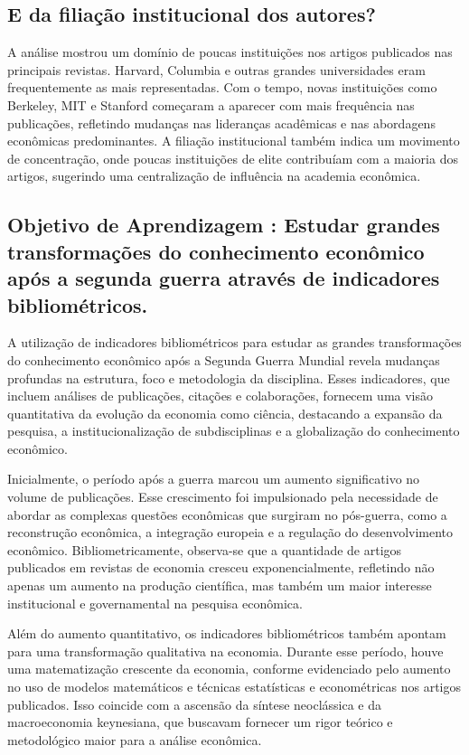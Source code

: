 \documentclass[a4paper,12pt]{article}[abntex2]
\begin{document}
\subsection{\textbf{E da filiação institucional dos autores?}}
 A análise mostrou um domínio de poucas instituições nos artigos publicados nas principais revistas. Harvard, Columbia e outras grandes universidades eram frequentemente as mais representadas. Com o tempo, novas instituições como Berkeley, MIT e Stanford começaram a aparecer com mais frequência nas publicações, refletindo mudanças nas lideranças acadêmicas e nas abordagens econômicas predominantes. A filiação institucional também indica um movimento de concentração, onde poucas instituições de elite contribuíam com a maioria dos artigos, sugerindo uma centralização de influência na academia econômica.

\subsection{\textbf{Objetivo de Aprendizagem : Estudar grandes transformações do conhecimento econômico após a segunda guerra através de indicadores bibliométricos.}}
A utilização de indicadores bibliométricos para estudar as grandes transformações do conhecimento econômico após a Segunda Guerra Mundial revela mudanças profundas na estrutura, foco e metodologia da disciplina. Esses indicadores, que incluem análises de publicações, citações e colaborações, fornecem uma visão quantitativa da evolução da economia como ciência, destacando a expansão da pesquisa, a institucionalização de subdisciplinas e a globalização do conhecimento econômico.

Inicialmente, o período após a guerra marcou um aumento significativo no volume de publicações. Esse crescimento foi impulsionado pela necessidade de abordar as complexas questões econômicas que surgiram no pós-guerra, como a reconstrução econômica, a integração europeia e a regulação do desenvolvimento econômico. Bibliometricamente, observa-se que a quantidade de artigos publicados em revistas de economia cresceu exponencialmente, refletindo não apenas um aumento na produção científica, mas também um maior interesse institucional e governamental na pesquisa econômica.

Além do aumento quantitativo, os indicadores bibliométricos também apontam para uma transformação qualitativa na economia. Durante esse período, houve uma matematização crescente da economia, conforme evidenciado pelo aumento no uso de modelos matemáticos e técnicas estatísticas e econométricas nos artigos publicados. Isso coincide com a ascensão da síntese neoclássica e da macroeconomia keynesiana, que buscavam fornecer um rigor teórico e metodológico maior para a análise econômica.
\end{document}
